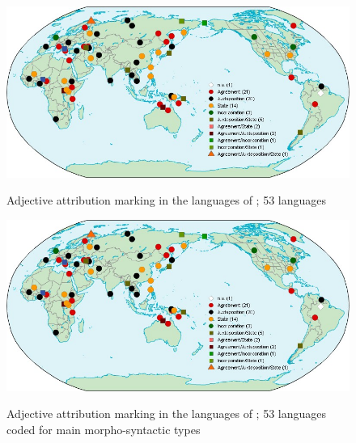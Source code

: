 \newpage
\begin{figure}
    \begin{minipage}[b][8cm][c]{2\baselineskip}
        \caption[Adjective attribution marking, North Asia]{Adjective attribution marking in the languages of ; 53 languages}
    \end{minipage}
\includegraphics[width=\textheight,angle=90]{figures/WorldMapTyp.jpg}%
\label{NAMap}
\end{figure}

\newpage
\begin{figure}
    \begin{minipage}[b][8cm][c]{2\baselineskip}
        \caption[Adjective attribution marking, North Asia, main types]{Adjective attribution marking in the languages of ; 53 languages coded for main morpho-syntactic types}
    \end{minipage}
\includegraphics[width=\textheight,angle=90]{figures/WorldMapTyp.jpg}%
\label{NAMapTyp}
\end{figure}

